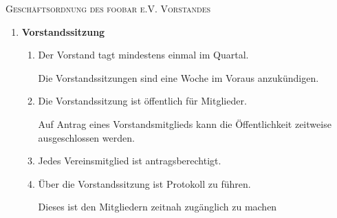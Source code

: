 

\pagestyle{empty}


\textsc{\Large Geschäftsordnung des foobar e.V. Vorstandes}
\begin{enumerate}[label=\bfseries §\arabic*]
\item \textbf{Vorstandssitzung}
  \begin{enumerate}[label=\bfseries (\arabic*),itemsep=6pt] 
  \item
    Der Vorstand tagt mindestens einmal im Quartal.

    Die Vorstandssitzungen sind eine Woche im Voraus anzukündigen.

  \item
    Die Vorstandssitzung ist öffentlich für Mitglieder.

    Auf Antrag eines Vorstandsmitglieds kann die Öffentlichkeit zeitweise ausgeschlossen
    werden.

  \item
    Jedes Vereinsmitglied ist antragsberechtigt.

  \item
    Über die Vorstandssitzung ist Protokoll zu führen.

    Dieses ist den Mitgliedern zeitnah zugänglich zu machen
  \end{enumerate}
\end{enumerate}

